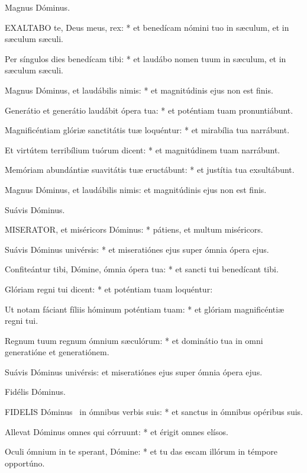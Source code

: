  Magnus Dóminus.


\lettrine[lines=2]{E}{XALTABO} te, Deus meus, rex: * et benedícam nómini tuo in sæculum, et in sæculum sæculi.

Per síngulos dies benedícam tibi: * et laudábo nomen tuum in sæculum, et in sæculum sæculi.

Magnus Dóminus, et laudábilis nimis: * et magnitúdinis ejus non est finis.

Generátio et generátio laudábit ópera tua: * et poténtiam tuam pronuntiábunt.

Magnificéntiam glóriæ sanctitátis tuæ loquéntur: * et mirabília tua narrábunt.

Et virtútem terribílium tuórum dicent: * et magnitúdinem tuam narrábunt.

Memóriam abundántiæ suavitátis tuæ eructábunt: * et justítia tua exsultábunt.

 Magnus Dóminus, et laudábilis nimis: et magnitúdinis ejus non est finis.

 Suávis Dóminus.


\lettrine[lines=2]{M}{ISERATOR}, et miséricors Dóminus: * pátiens, et multum miséricors.

Suávis Dóminus univérsis: * et miseratiónes ejus super ómnia ópera ejus.

Confiteántur tibi, Dómine, ómnia ópera tua: * et sancti tui benedícant tibi.

Glóriam regni tui dicent: * et poténtiam tuam loquéntur:

Ut notam fáciant fíliis hóminum poténtiam tuam: * et glóriam magnificéntiæ regni tui.

Regnum tuum regnum ómnium sæculórum: * et dominátio tua in omni generatióne et generatiónem.

 Suávis Dóminus univérsis: et miseratiónes ejus super ómnia ópera ejus.

 Fidélis Dóminus. \textdagger


\lettrine[lines=2]{F}{IDELIS} Dóminus \textdagger\ in ómnibus verbis suis: * et sanctus in ómnibus opéribus suis.

Allevat Dóminus omnes qui córruunt: * et érigit omnes elísos.

Oculi ómnium in te sperant, Dómine: * et tu das escam illórum in témpore opportúno.


